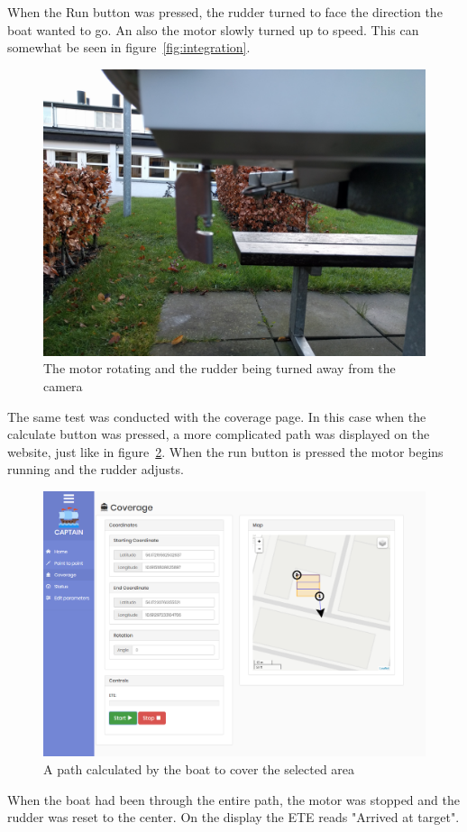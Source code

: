 When the Run button was pressed, the rudder turned to face the direction the boat wanted to go. An also the motor slowly turned up to speed. This can somewhat be seen in figure~\ref{fig:integration}.

\begin{figure}[H]
\centering
\includegraphics[width=0.7\linewidth]{Images/Integration/IMG_20171208_093712}
\caption{The motor rotating and the rudder being turned away from the camera}
\label{fig:integration_motor}
\end{figure}

The same test was conducted with the coverage page. In this case when the calculate button was pressed, a more complicated path was displayed on the website, just like in figure~\ref{fig:integration_coverage}. When the run button is pressed the motor begins running and the rudder adjusts. 

\begin{figure}[h]
\centering
\includegraphics[width=0.9\linewidth]{Images/Integration/integration_coverage}
\caption{A path calculated by the boat to cover the selected area}
\label{fig:integration_coverage}
\end{figure}
 
When the boat had been through the entire path, the motor was stopped and the rudder was reset to the center. On the display the ETE reads "Arrived at target".








